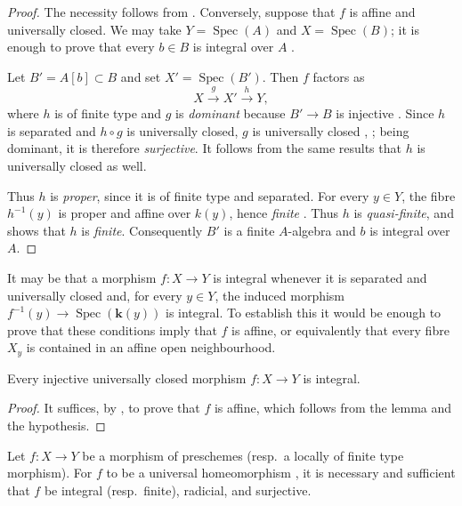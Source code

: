 \begin{proof}
The necessity follows from . Conversely, suppose that $f$ is affine and universally closed. We may take $Y=\operatorname{Spec}(A)$ and $X=\operatorname{Spec}(B)$; it is enough to prove that every $b\in B$ is integral over $A$ .

Let $B'=A[b]\subset B$ and set $X'=\operatorname{Spec}(B')$. Then $f$ factors as
\[
  X\xrightarrow{g}X'\xrightarrow{h}Y,
\]
where $h$ is of finite type and $g$ is \emph{dominant} because $B'\to B$ is injective . Since $h$ is separated and $h\circ g$ is universally closed, $g$ is universally closed , ; being dominant, it is therefore \emph{surjective}. It follows from the same results that $h$ is universally closed as well.

Thus $h$ is \emph{proper}, since it is of finite type and separated. For every $y\in Y$, the fibre $h^{-1}(y)$ is proper and affine over $k(y)$, hence \emph{finite} . Thus $h$ is \emph{quasi-finite}, and  shows that $h$ is \emph{finite}. Consequently $B'$ is a finite $A$-algebra and $b$ is integral over $A$.
\end{proof}

\begin{remark}[18.12.9]
\label{IV.18.12.9}
It may be that a morphism $f:X\to Y$ is integral whenever it is separated and universally closed and, for every $y\in Y$, the induced morphism $f^{-1}(y)\to\operatorname{Spec}(\boldsymbol{k}(y))$ is integral.
To establish this it would be enough to prove that these conditions imply that $f$ is affine, or equivalently that every fibre $X_y$ is contained in an affine open neighbourhood.
\end{remark}

\begin{corollary}[18.12.10]
\label{IV.18.12.10}
Every injective universally closed morphism $f:X\to Y$ is integral.
\end{corollary}

\begin{proof}
It suffices, by , to prove that $f$ is affine, which follows from the lemma  and the hypothesis.
\end{proof}

\begin{corollary}[18.12.11]
\label{IV.18.12.11}
Let $f:X\to Y$ be a morphism of preschemes \textup{(resp.}\ a locally of finite type morphism\textup{)}.
For $f$ to be a universal homeomorphism , it is necessary and sufficient that $f$ be integral \textup{(resp.}\ finite\textup{)}, radicial, and surjective.
\end{corollary}

